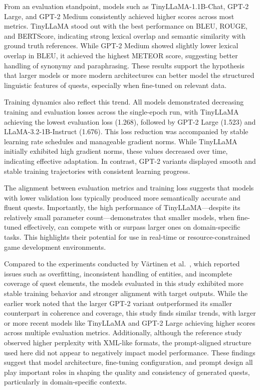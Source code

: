 From an evaluation standpoint, models such as TinyLLaMA-1.1B-Chat, GPT-2 Large,
and GPT-2 Medium consistently achieved higher scores across most metrics. TinyLLaMA
stood out with the best performance on BLEU, ROUGE, and BERTScore, indicating
strong lexical overlap and semantic similarity with ground truth references. While GPT-2
Medium showed slightly lower lexical overlap in BLEU, it achieved the highest METEOR
score, suggesting better handling of synonymy and paraphrasing. These results support
the hypothesis that larger models or more modern architectures can better model the
structured linguistic features of quests, especially when fine-tuned on relevant data.

Training dynamics also reflect this trend. All models demonstrated decreasing training
and evaluation losses across the single-epoch run, with TinyLLaMA achieving the lowest
evaluation loss (1.268), followed by GPT-2 Large (1.523) and LLaMA-3.2-1B-Instruct
(1.676). This loss reduction was accompanied by stable learning rate schedules and manageable
gradient norms. While TinyLLaMA initially exhibited high gradient norms, these
values decreased over time, indicating effective adaptation. In contrast, GPT-2 variants
displayed smooth and stable training trajectories with consistent learning progress.

The alignment between evaluation metrics and training loss suggests that models with
lower validation loss typically produced more semantically accurate and fluent quests.
Importantly, the high performance of TinyLLaMA—despite its relatively small parameter
count—demonstrates that smaller models, when fine-tuned effectively, can compete with
or surpass larger ones on domain-specific tasks. This highlights their potential for use in
real-time or resource-constrained game development environments.

Compared to the experiments conducted by V{\"a}rtinen et al.~\cite{vartinen2022generating}, which reported issues
such as overfitting, inconsistent handling of entities, and incomplete coverage of
quest elements, the models evaluated in this study exhibited more stable training behavior
and stronger alignment with target outputs. While the earlier work noted that the
larger GPT-2 variant outperformed its smaller counterpart in coherence and coverage, this
study finds similar trends, with larger or more recent models like TinyLLaMA and GPT-2 Large
achieving higher scores across multiple evaluation metrics. Additionally, although
the reference study observed higher perplexity with XML-like formats, the prompt-aligned
structure used here did not appear to negatively impact model performance. These findings
suggest that model architecture, fine-tuning configuration, and prompt design all play
important roles in shaping the quality and consistency of generated quests, particularly
in domain-specific contexts.

